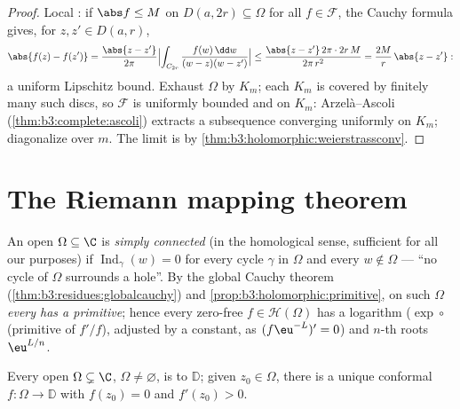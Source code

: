 \begin{proof}
Local : if $\abs f \leq M$ on $D(a, 2r)
\subseteq \Omega$ for all $f \in \mathcal F$, the Cauchy
formula gives, for $z, z' \in D(a, r)$,
\[
\abs{f(z) - f(z')} = \frac{\abs{z - z'}}{2\pi}
\Bigl|\int_{C_{2r}}\frac{f(w)\,\dd w}{(w-z)(w-z')}\Bigr|
\leq \frac{\abs{z - z'}\,2\pi\cdot2r\,M}{2\pi\,r^2}
= \frac{2M}{r}\,\abs{z - z'} :
\]
a uniform Lipschitz bound. Exhaust $\Omega$ by  $K_m$;
each $K_m$ is covered by finitely many such discs, so
$\mathcal F$ is uniformly bounded and  on
$K_m$: Arzel\`a--Ascoli (\cref{thm:b3:complete:ascoli})
extracts a subsequence converging uniformly on $K_m$;
diagonalize over $m$. The limit is  by
\cref{thm:b3:holomorphic:weierstrassconv}.
\end{proof}

\section{The Riemann mapping theorem}

\begin{definition}\label{def:b3:conformal:simplyconnected}
An open  $\Omega \subseteq \C$ is \emph{simply
connected} (in the homological
sense, sufficient for all our purposes) if
$\operatorname{Ind}_\gamma(w) = 0$ for every cycle $\gamma$ in
$\Omega$ and every $w \notin \Omega$ --- ``no cycle of
$\Omega$ surrounds a hole''. By the global Cauchy theorem
(\cref{thm:b3:residues:globalcauchy}) and
\cref{prop:b3:holomorphic:primitive}, on such $\Omega$
\emph{every  has a primitive}; hence every
zero-free $f \in \mathcal H(\Omega)$ has a 
logarithm ($\exp\circ$(primitive of $f'/f$), adjusted by a
constant, as $(f\eu^{-L})' = 0$) and  $n$-th roots
$\eu^{L/n}$.
\end{definition}

\begin{theorem}
\label{thm:b3:conformal:rmt}
Every  open $\Omega \subsetneq \C$, $\Omega
\neq \varnothing$, is  to $\mathbb D$;
given $z_0 \in \Omega$, there is a unique conformal $f \colon
\Omega \to \mathbb D$ with $f(z_0) = 0$ and $f'(z_0) >
0$.
\end{theorem}

